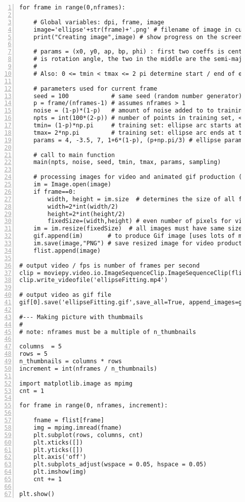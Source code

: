\documentclass[oneside,10pt]{book}
\begin{document}
\begin{lstlisting}[numbers=left]
for frame in range(0,nframes): 

    # Global variables: dpi, frame, image
    image='ellipse'+str(frame)+'.png' # filename of image in current frame
    print("Creating image",image) # show progress on the screen

    # params = (x0, y0, ap, bp, phi) : first two coeffs is center of ellipse, last one 
    # is rotation angle, the two in the middle are the semi-major and semi-minor axes.
    #
    # Also: 0 <= tmin < tmax <= 2 pi determine start / end of ellipse arc

    # parameters used for current frame 
    seed = 100            # same seed (random number generator) for all images 
    p = frame/(nframes-1) # assumes nframes > 1
    noise = (1-p)*(1-p)   # amount of noise added to to training set
    npts = int(100*(2-p)) # number of points in training set, < npts_max 
    tmin= (1-p)*np.pi     # training set: ellipse arc starts at tmin >= 0
    tmax= 2*np.pi         # training set: ellipse arc ends at tmax  < 2*Pi 
    params = 4, -3.5, 7, 1+6*(1-p), (p+np.pi/3) # ellipse parameters 

    # call to main function 
    main(npts, noise, seed, tmin, tmax, params, sampling)

    # processing images for video and animated gif production (using pillow library)
    im = Image.open(image)
    if frame==0:  
        width, height = im.size  # determines the size of all future images
        width=2*int(width/2)
        height=2*int(height/2)
        fixedSize=(width,height) # even number of pixels for video production 
    im = im.resize(fixedSize)  # all images must have same size to produce video
    gif.append(im)       # to produce Gif image [uses lots of memory if dpi > 100] 
    im.save(image,"PNG") # save resized image for video production
    flist.append(image)

# output video / fps is number of frames per second
clip = moviepy.video.io.ImageSequenceClip.ImageSequenceClip(flist, fps=20) 
clip.write_videofile('ellipseFitting.mp4')

# output video as gif file 
gif[0].save('ellipseFitting.gif',save_all=True, append_images=gif[1:],loop=0)  

#--- Making picture with thumbmails
#
# note: nframes must be a multiple of n_thumbnails

columns  = 5
rows = 5
n_thumbnails = columns * rows
increment = int(nframes / n_thumbnails) 

import matplotlib.image as mpimg
cnt = 1

for frame in range(0, nframes, increment):

    fname = flist[frame]
    img = mpimg.imread(fname)
    plt.subplot(rows, columns, cnt)
    plt.xticks([])  
    plt.yticks([])
    plt.axis('off')
    plt.subplots_adjust(wspace = 0.05, hspace = 0.05)
    plt.imshow(img)
    cnt += 1

plt.show()

\end{lstlisting}
\end{document}
